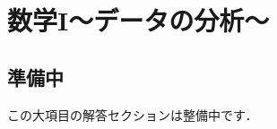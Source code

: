 \documentclass[../../ms_a.tex]{subfiles}
\begin{document}
\section{数学I～データの分析～}

\subsection*{準備中}
この大項目の解答セクションは整備中です．
\end{document}
